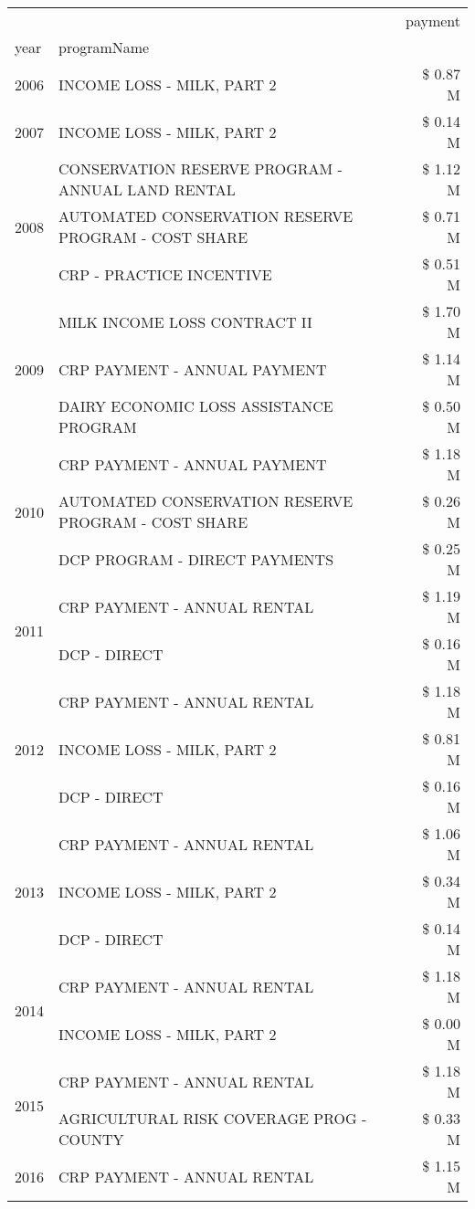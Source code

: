 \begin{tabular}{llr}
\toprule
 &  & payment \\
year & programName &  \\
\midrule
2006 & INCOME LOSS - MILK, PART 2 & \$ 0.87 M \\
\cline{1-3}
2007 & INCOME LOSS - MILK, PART 2 & \$ 0.14 M \\
\cline{1-3}
\multirow[t]{3}{*}{2008} & CONSERVATION RESERVE PROGRAM - ANNUAL LAND RENTAL & \$ 1.12 M \\
 & AUTOMATED CONSERVATION RESERVE PROGRAM - COST SHARE & \$ 0.71 M \\
 & CRP - PRACTICE INCENTIVE & \$ 0.51 M \\
\cline{1-3}
\multirow[t]{3}{*}{2009} & MILK INCOME LOSS CONTRACT II & \$ 1.70 M \\
 & CRP PAYMENT - ANNUAL PAYMENT & \$ 1.14 M \\
 & DAIRY ECONOMIC LOSS ASSISTANCE PROGRAM & \$ 0.50 M \\
\cline{1-3}
\multirow[t]{3}{*}{2010} & CRP PAYMENT - ANNUAL PAYMENT & \$ 1.18 M \\
 & AUTOMATED CONSERVATION RESERVE PROGRAM - COST SHARE & \$ 0.26 M \\
 & DCP PROGRAM - DIRECT PAYMENTS & \$ 0.25 M \\
\cline{1-3}
\multirow[t]{2}{*}{2011} & CRP PAYMENT - ANNUAL RENTAL & \$ 1.19 M \\
 & DCP - DIRECT & \$ 0.16 M \\
\cline{1-3}
\multirow[t]{3}{*}{2012} & CRP PAYMENT - ANNUAL RENTAL & \$ 1.18 M \\
 & INCOME LOSS - MILK, PART 2 & \$ 0.81 M \\
 & DCP - DIRECT & \$ 0.16 M \\
\cline{1-3}
\multirow[t]{3}{*}{2013} & CRP PAYMENT - ANNUAL RENTAL & \$ 1.06 M \\
 & INCOME LOSS - MILK, PART 2 & \$ 0.34 M \\
 & DCP - DIRECT & \$ 0.14 M \\
\cline{1-3}
\multirow[t]{2}{*}{2014} & CRP PAYMENT - ANNUAL RENTAL & \$ 1.18 M \\
 & INCOME LOSS - MILK, PART 2 & \$ 0.00 M \\
\cline{1-3}
\multirow[t]{2}{*}{2015} & CRP PAYMENT - ANNUAL RENTAL & \$ 1.18 M \\
 & AGRICULTURAL RISK COVERAGE PROG - COUNTY & \$ 0.33 M \\
\cline{1-3}
\multirow[t]{3}{*}{2016} & CRP PAYMENT - ANNUAL RENTAL & \$ 1.15 M \\

\end{tabular}
